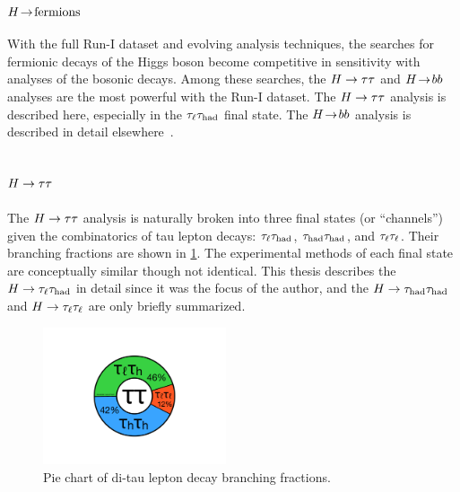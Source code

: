 \subsubsection{$H \!\rightarrow\! \text{fermions}$}

With the full Run-I dataset and evolving analysis techniques, the searches for fermionic decays of the Higgs boson become competitive in sensitivity with analyses of the bosonic decays. Among these searches, the $H\rightarrow\tau\tau$ and $H \!\rightarrow\! bb$ analyses are the most powerful with the Run-I dataset. The $H\rightarrow\tau\tau$ analysis is described here, especially in the $\tau_\ell\tau_\text{had}$ final state. The $H \!\rightarrow\! bb$ analysis is described in detail elsewhere~\cite{HIGG-2013-23}.



\subsection{$H\rightarrow\tau\tau$}
\label{sec:strategy-htautau}

The $H\rightarrow\tau\tau$ analysis is naturally broken into three final states (or ``channels'') given the combinatorics of tau lepton decays: $\tau_\ell\tau_\text{had}$, $\tau_\text{had}\tau_\text{had}$, and $\tau_\ell\tau_\ell$. Their branching fractions are shown in \cref{fig:strategy-decaypie}. The experimental methods of each final state are conceptually similar though not identical. This thesis describes the $H\rightarrow\tau_\ell\tau_\text{had}$ in detail since it was the focus of the author, and the $H\rightarrow\tau_\text{had}\tau_\text{had}$ and $H\rightarrow\tau_\ell\tau_\ell$ are only briefly summarized.

\begin{figure}[tp]
  \centering
  \includegraphics[width=0.48\textwidth]{figures/piecharts/tautaudecay}
  \caption{Pie chart of di-tau lepton decay branching fractions.}
  \label{fig:strategy-decaypie}
\end{figure}

